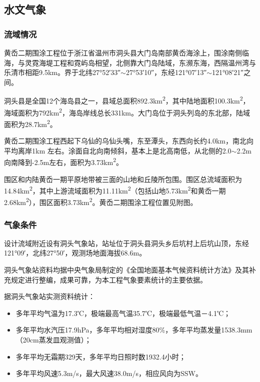 \documentclass[UTF8, a4paper, 12pt]{ctexart} %
\begin{document}
\subsection{水文气象}
\subsubsection{流域情况}
黄岙二期围涂工程位于浙江省温州市洞头县大门岛南部黄岙海涂上，围涂南侧临海，与灵霓海堤工程和霓屿岛相望，北侧靠大门岛陆域，东濒东海，西隔温州湾与乐清市相距9.5km。界于北纬27°52′33″$\sim$27°53′10″，东经121°07′13″$\sim$121°08′21″之间。

洞头县是全国12个海岛县之一，县域总面积892.3km\textsuperscript{2}，其中陆地面积100.3km\textsuperscript{2}，海域面积为792km\textsuperscript{2}，海岛岸线总长331km。大门岛位于洞头列岛的东北部，陆域面积为28.7km\textsuperscript{2}。

黄岙二期围涂工程西起下乌仙的乌仙头嘴，东至潭头，东西向长约4.0km，南北向平均离岸1km 左右。涂面自北向南倾斜，基本上是北高南低，从北侧的2.0$\sim$2.2m 向南降到-2.5m左右，面积为3.73km\textsuperscript{2}。

围区和内陆黄岙一期平原地带被三面的山地和丘陵所包围。围区总流域面积为14.84km\textsuperscript{2}，其中上游流域面积为11.11km\textsuperscript{2}（包括山地5.73km\textsuperscript{2}和黄岙一期2.68km\textsuperscript{2}），围区面积3.73km\textsuperscript{2}。黄岙二期围涂工程位置见附图。



\subsubsection{气象条件}
设计流域附近设有洞头气象站，站址位于洞头县洞头乡后坑村上后坑山顶，东经121°09′，北纬27°50′，观测场地面海拔68.6m。

洞头气象站资料均据中央气象局制定的《全国地面基本气候资料统计方法》及其补充规定进行整编，成果可靠，为本工程气象要素统计的主要依据。

据洞头气象站实测资料统计：
\begin{itemize}
    \item 多年平均气温为17.3℃，极端最高气温35.7℃，极端最低气温－4.1℃；
    \item 多年平均水汽压17.9hPa，多年平均相对湿度80\%，多年平均蒸发量1538.3mm（20cm蒸发皿观测值）；
    \item 多年平均无霜期329天，多年平均日照时数1932.4小时；
    \item 多年平均风速5.3m/s，最大风速38.0m/s，相应风向为SSW。
\end{itemize}
\end{document}
